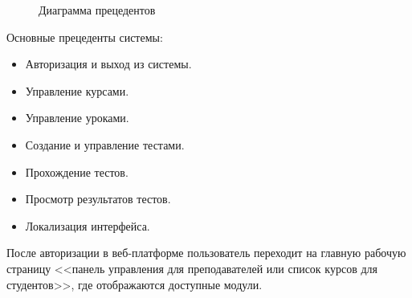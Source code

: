 \begin{figure}[ht]
	\caption{Диаграмма прецедентов}
	\label{comp:image}
\end{figure}

Основные прецеденты системы:
\begin{itemize}
\item Авторизация и выход из системы.
\item Управление курсами.
\item Управление уроками.
\item Создание и управление тестами.
\item Прохождение тестов.
\item Просмотр результатов тестов.
\item Локализация интерфейса.

\end{itemize}


После авторизации в веб-платформе пользователь переходит на главную рабочую страницу <<панель управления для преподавателей или список курсов для студентов>>,  где отображаются доступные модули.

